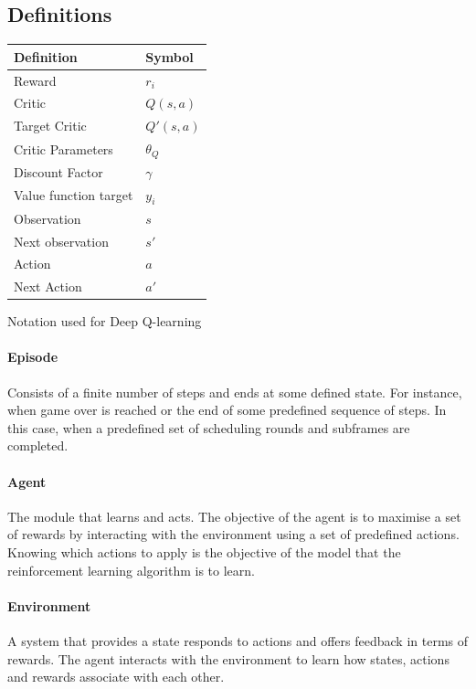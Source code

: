 \subsection{Definitions}
\begin{margintable}
    \centering
    \footnotesize{
    \begin{tabular}{l|l}
        Definition & Symbol  \\ \hline
        Reward & $r_i$ \\
        Critic & $Q(s, a)$ \\
        Target Critic & $Q'(s, a)$\\
        Critic Parameters & $\theta_Q$ \\
        Discount Factor & $\gamma$ \\
        Value function target & $y_i$ \\
        Observation & $s$ \\
        Next observation & $s'$ \\
        Action & $a$ \\
        Next Action & $a'$ \\
    \end{tabular}
    \caption{Notation used for Deep Q-learning}
    \label{tab:deep_q_learning_symbols}
    }
\end{margintable}

\paragraph{Episode}
Consists of a finite number of steps and ends at some defined state. For instance, when game over is reached or the end of some predefined sequence of steps. In this case, when a predefined set of scheduling rounds and subframes are completed.

\paragraph{Agent}
The module that learns and acts. The objective of the agent is to maximise a set of rewards by interacting with the environment using a set of predefined actions. Knowing which actions to apply is the objective of the model that the reinforcement learning algorithm is to learn.

\paragraph{Environment}
A system that provides a state responds to actions and offers feedback in terms of rewards. The agent interacts with the environment to learn how states, actions and rewards associate with each other.

